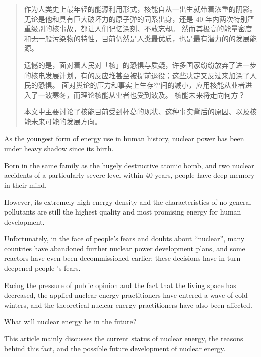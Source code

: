 
\begin{abstract}

作为人类史上最年轻的能源利用形式，核能自从一出生就带着浓重的阴影。
无论是他和具有巨大破坏力的原子弹的同系出身，还是 40 年内两次特别严重级别的核事故，都让人们记忆深刻、不敢忘却。
然而其极高的能量密度和无一般污染物的特性，目前仍然是人类最优质，也是最有潜力的的发展能源。

遗憾的是，面对着人民对「核」的恐惧与质疑，许多国家纷纷放弃了进一步的核电发展计划，有的反应堆甚至被提前退役；这些决定又反过来加深了人民的恐惧。
面对舆论的压力和事实上生存空间的减小，应用核能从业者进入了一波寒冬，而理论核能从业者也受到波及。
核能未来将走向何方？

本文中主要讨论了核能目前受到杯葛的现状、这种事实背后的原因、以及核能未来可能的发展方向。

\end{abstract}

\begin{englishabstract}
As the youngest form of energy use in human history, nuclear power has been under heavy shadow since its birth.

Born in the same family as the hugely destructive atomic bomb, 
and two nuclear accidents of a particularly severe level within 40 years, 
people have deep memory in their mind.

However, its extremely high energy density and the characteristics of no general pollutants 
are still the highest quality and most promising energy for human development.
    
Unfortunately, in the face of people’s fears and doubts about “nuclear”, 
many countries have abandoned further nuclear power development plans, 
and some reactors have even been decommissioned earlier; 
these decisions have in turn deepened people ’s fears.

Facing the pressure of public opinion and the fact that the living space has decreased, 
the applied nuclear energy practitioners have entered a wave of cold winters, 
and the theoretical nuclear energy practitioners have also been affected.

What will nuclear energy be in the future?
    
This article mainly discusses the current status of nuclear energy, 
the reasons behind this fact, 
and the possible future development of nuclear energy.

\end{englishabstract}

